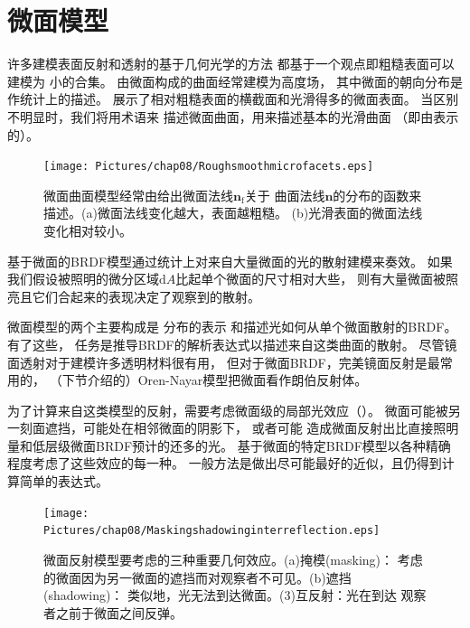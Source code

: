 \section{微面模型}\label{sec:微面模型}

许多建模表面反射和透射的基于几何光学的方法
都基于一个观点即粗糙表面可以建模为
小的合集。
由微面构成的曲面经常建模为高度场，
其中微面的朝向分布是作统计上的描述。
展示了相对粗糙表面的横截面和光滑得多的微面表面。
当区别不明显时，我们将用术语来
描述微面曲面，用来描述基本的光滑曲面
（即由表示的）。
\begin{figure}[htbp]
    \centering
    \texttt{[image: Pictures/chap08/Roughsmoothmicrofacets.eps]}
    \caption{微面曲面模型经常由给出微面法线${\bm n}_{\mathrm{f}}$关于
        曲面法线$\bm n$的分布的函数来描述。(a)微面法线变化越大，表面越粗糙。
        (b)光滑表面的微面法线变化相对较小。}
    \label{fig:8.12}
\end{figure}

基于微面的BRDF模型通过统计上对来自大量微面的光的散射建模来奏效。
如果我们假设被照明的微分区域$\mathrm{d}A$比起单个微面的尺寸相对大些，
则有大量微面被照亮且它们合起来的表现决定了观察到的散射。

微面模型的两个主要构成是
分布的表示
和描述光如何从单个微面散射的BRDF。有了这些，
任务是推导BRDF的解析表达式以描述来自这类曲面的散射。
尽管镜面透射对于建模许多透明材料很有用，
但对于微面BRDF，完美镜面反射是最常用的，
（下节介绍的）Oren-Nayar模型把微面看作朗伯反射体。

为了计算来自这类模型的反射，需要考虑微面级的局部光效应（）。
微面可能被另一刻面遮挡，可能处在相邻微面的阴影下，
或者可能
造成微面反射出比直接照明量和低层级微面BRDF预计的还多的光。
基于微面的特定BRDF模型以各种精确程度考虑了这些效应的每一种。
一般方法是做出尽可能最好的近似，且仍得到计算简单的表达式。
\begin{figure}[htbp]
    \centering
    \texttt{[image: Pictures/chap08/Maskingshadowinginterreflection.eps]}
    \caption{微面反射模型要考虑的三种重要几何效应。(a)掩模(masking)：
        考虑的微面因为另一微面的遮挡而对观察者不可见。(b)遮挡(shadowing)：
        类似地，光无法到达微面。(3)互反射：光在到达
        观察者之前于微面之间反弹。}
    \label{fig:8.13}
\end{figure}

